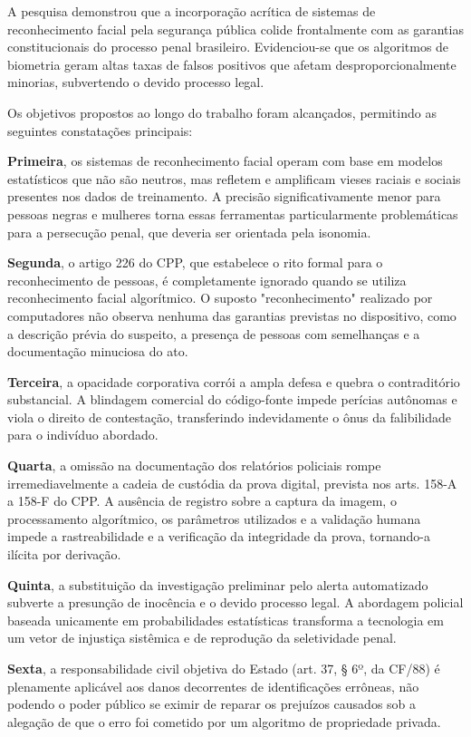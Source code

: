 \documentclass[12pt,a4paper]{article}
\begin{document}
A pesquisa demonstrou que a incorporação acrítica de sistemas de reconhecimento facial pela segurança pública colide frontalmente com as garantias constitucionais do processo penal brasileiro. Evidenciou-se que os algoritmos de biometria geram altas taxas de falsos positivos que afetam desproporcionalmente minorias, subvertendo o devido processo legal.

Os objetivos propostos ao longo do trabalho foram alcançados, permitindo as seguintes constatações principais:

\textbf{Primeira}, os sistemas de reconhecimento facial operam com base em modelos estatísticos que não são neutros, mas refletem e amplificam vieses raciais e sociais presentes nos dados de treinamento. A precisão significativamente menor para pessoas negras e mulheres torna essas ferramentas particularmente problemáticas para a persecução penal, que deveria ser orientada pela isonomia.

\textbf{Segunda}, o artigo 226 do CPP, que estabelece o rito formal para o reconhecimento de pessoas, é completamente ignorado quando se utiliza reconhecimento facial algorítmico. O suposto "reconhecimento" realizado por computadores não observa nenhuma das garantias previstas no dispositivo, como a descrição prévia do suspeito, a presença de pessoas com semelhanças e a documentação minuciosa do ato.

\textbf{Terceira}, a opacidade corporativa corrói a ampla defesa e quebra o contraditório substancial. A blindagem comercial do código-fonte impede perícias autônomas e viola o direito de contestação, transferindo indevidamente o ônus da falibilidade para o indivíduo abordado.

\textbf{Quarta}, a omissão na documentação dos relatórios policiais rompe irremediavelmente a cadeia de custódia da prova digital, prevista nos arts. 158-A a 158-F do CPP. A ausência de registro sobre a captura da imagem, o processamento algorítmico, os parâmetros utilizados e a validação humana impede a rastreabilidade e a verificação da integridade da prova, tornando-a ilícita por derivação.

\textbf{Quinta}, a substituição da investigação preliminar pelo alerta automatizado subverte a presunção de inocência e o devido processo legal. A abordagem policial baseada unicamente em probabilidades estatísticas transforma a tecnologia em um vetor de injustiça sistêmica e de reprodução da seletividade penal.

\textbf{Sexta}, a responsabilidade civil objetiva do Estado (art. 37, § 6º, da CF/88) é plenamente aplicável aos danos decorrentes de identificações errôneas, não podendo o poder público se eximir de reparar os prejuízos causados sob a alegação de que o erro foi cometido por um algoritmo de propriedade privada.
\end{document}
